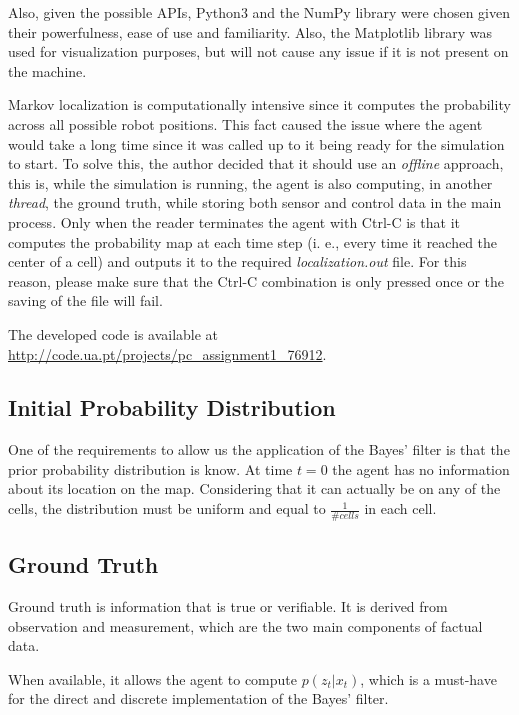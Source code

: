 \documentclass[runningheads]{llncs}
\begin{document}
Also, given the possible APIs, Python3 and the NumPy \cite{harris2020array} library were chosen given their powerfulness, ease of use and familiarity. Also, the Matplotlib \cite{Hunter:2007} library was used for visualization purposes, but will not cause any issue if it is not present on the machine.

Markov localization is computationally intensive since it computes the probability across all possible robot positions. This fact caused the issue where the agent would take a long time since it was called up to it being ready for the simulation to start. To solve this, the author decided that it should use an \emph{offline} approach, this is, while the simulation is running, the agent is also computing, in another \emph{thread}, the ground truth, while storing both sensor and control data in the main process. Only when the reader terminates the agent with Ctrl-C is that it computes the probability map at each time step (i. e., every time it reached the center of a cell) and outputs it to the required \emph{localization.out} file. For this reason, please make sure that the Ctrl-C combination is only pressed once or the saving of the file will fail.

The developed code is available at \url{http://code.ua.pt/projects/pc_assignment1_76912}.

\subsection{Initial Probability Distribution}
\label{subsec:initial_distribution}

One of the requirements to allow us the application of the Bayes' filter is that the prior probability distribution is know. At time $t = 0$ the agent has no information about its location on the map. Considering that it can actually be on any of the cells, the distribution must be uniform and equal to $\frac{1}{\# cells}$ in each cell.

\subsection{Ground Truth}
\label{subsec:ground_truth}

Ground truth is information that is true or verifiable. It is derived from observation and measurement, which are the two main components of factual data.

When available, it allows the agent to compute $p(z_t \vert x_t)$, which is a must-have for the direct and discrete implementation of the Bayes' filter.
\end{document}
